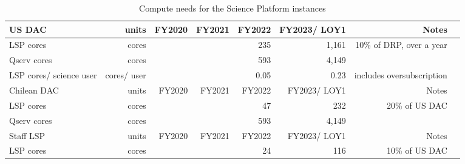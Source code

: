 \tiny \begin{longtable} { |p{}  |r  |r  |r  |r  |r  |r  |r |} 
\caption{Compute needs for the Science Platform instances \label{tab:lspSizing}}\\ 
\hline 
\textbf{US DAC}&\textbf{units}&\textbf{FY2020}&\textbf{FY2021}&\textbf{FY2022}&\textbf{FY2023/ LOY1}&\textbf{Notes} \\ \hline
{LSP cores}&{cores}&{}&{}&{235}&{1,161}&{10\% of DRP, over a year} \\ \hline
{Qserv cores}&{cores}&{}&{}&{593}&{4,149}& \\ \hline
{LSP cores/ science user}&{cores/ user}&{}&{}&{0.05}&{0.23}&{includes oversubscription} \\ \hline
{Chilean DAC}&{units}&{FY2020}&{FY2021}&{FY2022}&{FY2023/ LOY1}&{Notes} \\ \hline
{LSP cores}&{cores}&{}&{}&{47}&{232}&{20\% of US DAC} \\ \hline
{Qserv cores}&{cores}&{}&{}&{593}&{4,149}& \\ \hline
{Staff LSP}&{units}&{FY2020}&{FY2021}&{FY2022}&{FY2023/ LOY1}&{Notes} \\ \hline
{LSP cores}&{cores}&{}&{}&{24}&{116}&{10\% of US DAC} \\ \hline
\end{longtable} \normalsize
